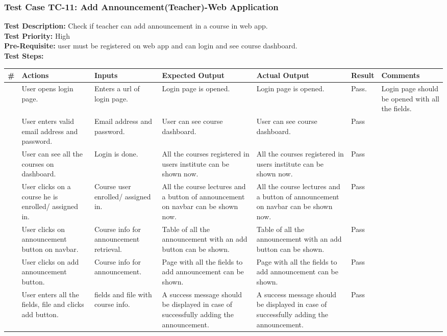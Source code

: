 \documentclass[12pt]{article}
\begin{document}
\subsubsection{Test Case TC-11: Add Announcement(Teacher)-Web Application}
\textbf{Test Description: } Check if teacher can add announcement in a course in web app. \\
\textbf{Test Priority: } High \\
\textbf{Pre-Requisite: } user must be registered on web app and can login and see course dashboard. \\
\textbf{Test Steps: }
\begin{longtable}{ |>{\raggedright\arraybackslash} p{0.7cm} | >{\raggedright\arraybackslash}p{2cm}|>{\raggedright\arraybackslash} p{2cm} |>{\raggedright\arraybackslash} p{2.5cm} |>{\raggedright\arraybackslash} p{2.5cm} |>{\raggedright\arraybackslash} p{1.3cm} |>{\raggedright\arraybackslash} p{2.5cm} | } 
\hline
\textbf{\#}
& \textbf{Actions} 
& \textbf{Inputs}
& \textbf{Expected Output} 
& \textbf{Actual Output} 
& \textbf{Result} 
& \textbf{Comments} 
\\ 
\hline
1
& User opens login page. 
& Enters a url of login page.
& Login page is opened.
& Login page is opened.
& Pass.
& Login page should be opened with all the fields.
\\ 
\hline
2 
& User enters valid email address and password.
& Email address and password.
& User can see course dashboard.
& User can see course dashboard. 
& Pass
&  
\\ 
\hline
3
& User can see all the courses on dashboard.
& Login is done.
& All the courses registered in users institute can be shown now.
& All the courses registered in users institute can be shown now. 
& Pass
&  
\\ 
\hline
4
& User clicks on a course he is enrolled/ assigned in.
& Course user enrolled/ assigned in.
& All the course lectures and a button of announcement on navbar can be shown now.
& All the course lectures and a button of announcement on navbar can be shown now. 
& Pass
&  
\\ 
\hline
5
& User clicks on announcement button on navbar.
& Course info for announcement retrieval.
& Table of all the announcement with an add button can be shown.
& Table of all the announcement with an add button can be shown. 
& Pass
&  
\\ 
\hline
6
& User clicks on add announcement button.
& Course info for announcement.
& Page with all the fields to add announcement can be shown.
& Page with all the fields to add announcement can be shown. 
& Pass
&  
\\ 
\hline
7
& User enters all the fields, file and clicks add button.
& fields and file with course info.
& A success message should be displayed in case of successfully adding the announcement.
& A success message should be displayed in case of successfully adding the announcement. 
& Pass
&  
\\ 
\hline
\end{longtable}
\end{document}

